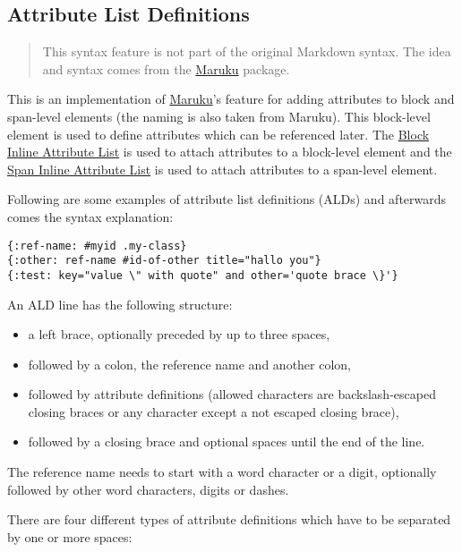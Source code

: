 \documentclass[a4paper]{article}
\begin{document}
\hypertarget{attribute-list-definitions}{\subsection{Attribute List
Definitions}\label{attribute-list-definitions}}

\begin{quote}
This syntax feature is not part of the original Markdown syntax. The
idea and syntax comes from the
\href{http://maruku.rubyforge.org}{Maruku} package.
\end{quote}

This is an implementation of
\href{http://maruku.rubyforge.org}{Maruku}'s feature for adding
attributes to block and span-level elements (the naming is also taken
from Maruku). This block-level element is used to define attributes
which can be referenced later. The \protect\hyperlink{block-ials}{Block
Inline Attribute List} is used to attach attributes to a block-level
element and the \protect\hyperlink{span-ials}{Span Inline Attribute
List} is used to attach attributes to a span-level element.

Following are some examples of attribute list definitions (ALDs) and
afterwards comes the syntax explanation:

\begin{verbatim}
{:ref-name: #myid .my-class}
{:other: ref-name #id-of-other title="hallo you"}
{:test: key="value \" with quote" and other='quote brace \}'}
\end{verbatim}

An ALD line has the following structure:

\begin{itemize}
\item
  a left brace, optionally preceded by up to three spaces,
\item
  followed by a colon, the reference name and another colon,
\item
  followed by attribute definitions (allowed characters are
  backslash-escaped closing braces or any character except a not escaped
  closing brace),
\item
  followed by a closing brace and optional spaces until the end of the
  line.
\end{itemize}

The reference name needs to start with a word character or a digit,
optionally followed by other word characters, digits or dashes.

There are four different types of attribute definitions which have to be
separated by one or more spaces:
\end{document}
